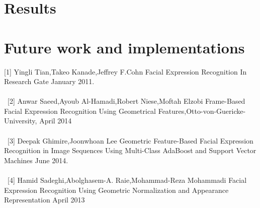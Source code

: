 \documentclass[journal]{IEEEtran}
\begin{document}
\section{Results}





\section{Future work and implementations}





%




\vspace{5mm}
\ifCLASSOPTIONcaptionsoff
  \newpage
\fi


\begin{thebibliography}{1}

\bibitem

 [1] Yingli Tian,Takeo Kanade,Jeffrey F.Cohn Facial Expression Recognition In Research Gate January 2011. \\ \\
 
 \ [2] Anwar Saeed,Ayoub Al-Hamadi,Robert Niese,Moftah Elzobi Frame-Based Facial Expression Recognition Using Geometrical Features,Otto-von-Guericke-University, April 2014 \\ \\
 
 \ [3] Deepak Ghimire,Joonwhoan Lee Geometric Feature-Based Facial Expression Recognition in Image Sequences Using Multi-Class AdaBoost and Support Vector Machines June 2014. \\ \\

\ [4] Hamid Sadeghi,Abolghasem-A. Raie,Mohammad-Reza Mohammadi Facial Expression Recognition Using Geometric Normalization and Appearance Representation April 2013 \\ \\
 
\ 


\end{thebibliography}


\end{document}
